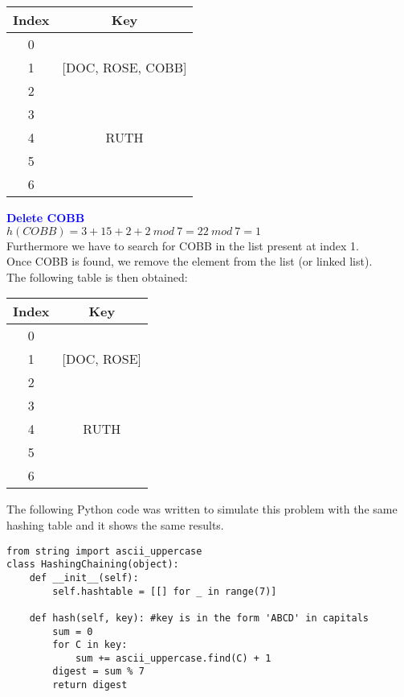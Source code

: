 \documentclass[11pt]{article}
\begin{document}
\begin{enumerate}
    \begin{center}
    \begin{tabular}{ | c | c | } 
        \hline
        Index & Key \\ 
        \hline\hline
        0 & \\
        \hline
        1 & [DOC, ROSE, COBB]\\
        \hline
        2 & \\
        \hline
        3 & \\
        \hline
        4 & RUTH\\
        \hline
        5 & \\
        \hline
        6 & \\
        \hline
    \end{tabular}
    \end{center}
\textbf{\textcolor{blue}{Delete COBB}}
    \\ $h(COBB)=3+15+2+2\ mod\ 7 = 22\ mod\ 7 = 1$
    \\ Furthermore we have to search for COBB in the list present at index 1.
    \\ Once COBB is found, we remove the element from the list (or linked list).
    \\ The following table is then obtained:
    \begin{center}
    \begin{tabular}{ | c | c | } 
        \hline
        Index & Key \\ 
        \hline\hline
        0 & \\
        \hline
        1 & [DOC, ROSE]\\
        \hline
        2 & \\
        \hline
        3 & \\
        \hline
        4 & RUTH\\
        \hline
        5 & \\
        \hline
        6 & \\
        \hline
    \end{tabular}
    \end{center}
    
    The following Python code was written to simulate this problem with the same hashing table and it shows the same results.
    \begin{verbatim}
from string import ascii_uppercase        
class HashingChaining(object):
    def __init__(self):
        self.hashtable = [[] for _ in range(7)]
        
    def hash(self, key): #key is in the form 'ABCD' in capitals
        sum = 0
        for C in key:
            sum += ascii_uppercase.find(C) + 1
        digest = sum % 7
        return digest
        

\end{verbatim}
\end{enumerate}
\end{document}
